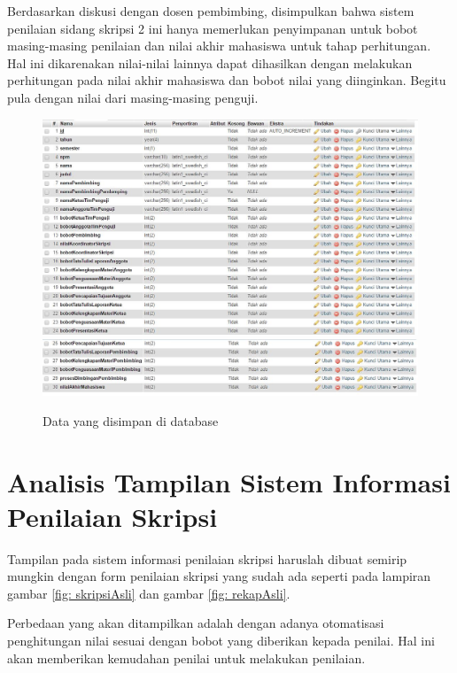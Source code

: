 	Berdasarkan diskusi dengan dosen pembimbing, disimpulkan bahwa sistem penilaian sidang skripsi 2 ini hanya memerlukan penyimpanan untuk bobot masing-masing penilaian dan nilai akhir mahasiswa untuk tahap perhitungan. Hal ini dikarenakan nilai-nilai lainnya dapat dihasilkan dengan melakukan perhitungan pada  nilai akhir mahasiswa dan bobot nilai yang diinginkan. Begitu pula dengan nilai dari masing-masing penguji.
	
		\begin{figure}[H]
			\centering
			\includegraphics[scale= 1.0]{Gambar/database1}
			\includegraphics[scale= 1.0]{Gambar/database2}
			\caption {Data yang disimpan di database}
			\label{fig:tabeldata}
		\end{figure}
	
\section{Analisis Tampilan Sistem Informasi Penilaian Skripsi}
\label{sec: analisisTampilan}
	
	Tampilan pada sistem informasi penilaian skripsi haruslah dibuat semirip mungkin dengan form penilaian skripsi yang sudah ada seperti pada lampiran gambar \ref{fig: skripsiAsli} dan gambar \ref{fig: rekapAsli}.
	
	Perbedaan yang akan ditampilkan adalah dengan adanya otomatisasi penghitungan nilai sesuai dengan bobot yang diberikan kepada penilai. Hal ini akan memberikan kemudahan penilai untuk melakukan penilaian.
	
